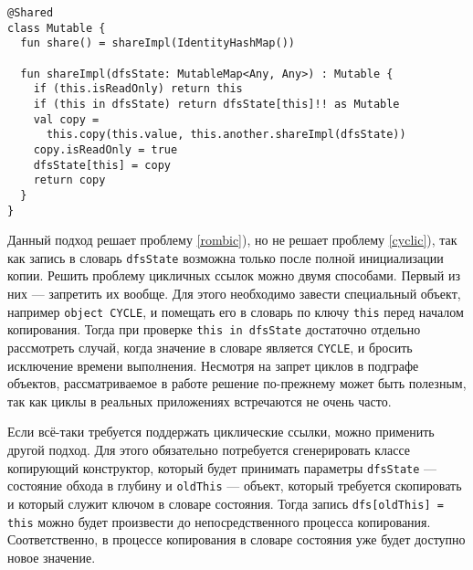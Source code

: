\documentclass[specification,annotation,times]{itmo-student-thesis}
\begin{document}
\begin{lstlisting}[float=h!,caption={Усовершенствование share},label={share_impl}]
@Shared
class Mutable {
  fun share() = shareImpl(IdentityHashMap())
    
  fun shareImpl(dfsState: MutableMap<Any, Any>) : Mutable {
    if (this.isReadOnly) return this
	if (this in dfsState) return dfsState[this]!! as Mutable
	val copy = 
	  this.copy(this.value, this.another.shareImpl(dfsState))
	copy.isReadOnly = true
	dfsState[this] = copy
	return copy
  }
}
\end{lstlisting}

Данный подход решает проблему \ref{rombic}), но не решает проблему \ref{cyclic}), так как запись в словарь \texttt{dfsState} возможна только после полной инициализации копии.
Решить проблему цикличных ссылок можно двумя способами. Первый из них --- запретить их вообще. Для этого необходимо завести специальный объект, например \texttt{object CYCLE}, и помещать его в словарь по ключу \texttt{this} перед началом копирования.
Тогда при проверке \texttt{this in dfsState} достаточно отдельно рассмотреть случай, когда значение в словаре является \texttt{CYCLE}, и бросить исключение времени выполнения.
Несмотря на запрет циклов в подграфе объектов, рассматриваемое в работе решение по-прежнему может быть полезным, так как циклы в реальных приложениях встречаются не очень часто.

Если всё-таки требуется поддержать циклические ссылки, можно применить другой подход.
Для этого обязательно потребуется сгенерировать классе копирующий конструктор, который будет принимать параметры \texttt{dfsState} --- состояние обхода в глубину и \texttt{oldThis} --- объект, который требуется скопировать и который служит ключом в словаре состояния.
Тогда запись \texttt{dfs[oldThis] = this} можно будет произвести до непосредственного процесса копирования. Соответственно, в процессе копирования в словаре состояния уже будет доступно новое значение.
\end{document}
